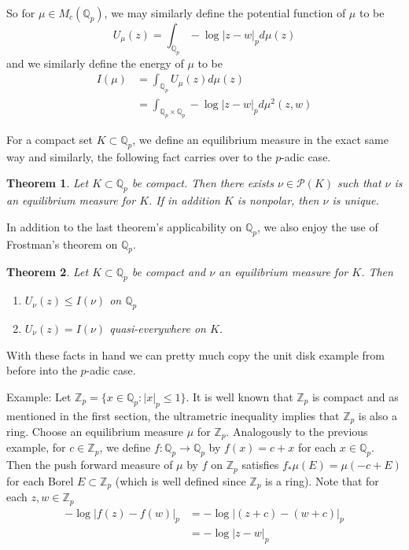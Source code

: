 \documentclass[12pt]{amsart}
\newtheorem{thm}{Theorem}[subsection]
\theoremstyle{definition}
\theoremstyle{remark}
\theoremstyle{definition}
\newcommand{\Z}{\mathbb{Z}}
\newcommand{\Q}{\mathbb{Q}}
\newcommand{\MCP}{\mathcal{P}}
\begin{document}
So for $\mu \in M_c(\Q_p)$, we may similarly define the potential function of $\mu$ to be $$U_{\mu}(z) = \int_{\Q_p}-\log|z-w|_pd\mu (z)$$ and we similarly define the energy of $\mu$ to be 
\begin{align*}
I(\mu) 
&= \int_{\Q_p}U_{\mu}(z)d \mu (z)\\
&= \int_{\Q_p \times \Q_p}-\log|z-w|_p d\mu^2(z,w)
\end{align*}

For a compact set $K \subset \Q_p$, we define an equilibrium measure in the exact same way and similarly, the following fact carries over to the $p$-adic case.

\begin{thm}
Let $K \subset \Q_p$ be compact. Then there exists $\nu \in \MCP(K)$ such that $\nu$ is an equilibrium measure for $K$. If in addition $K$ is nonpolar, then $\nu$ is unique.
\end{thm}

In addition to the last theorem's applicability on $\Q_p$, we also enjoy the use of Frostman's theorem on $\Q_p$.

\begin{thm}
Let $K \subset \Q_p$ be compact and $\nu$ an equilibrium measure for $K$. Then 
\begin{enumerate}
\item $U_\nu(z) \leq I(\nu)$ on $\Q_p$
\item $U_\nu(z) = I(\nu)$ quasi-everywhere on $K$. 
\end{enumerate}
\end{thm}

With these facts in hand we can pretty much copy the unit disk example from before into the $p$-adic case.

Example: Let $\Z_p = \{x \in \Q_p: |x|_p \leq 1\}$. It is well known that $\Z_p$ is compact and as mentioned in the first section, the ultrametric inequality implies that $\Z_p$ is also a ring. Choose an equilibrium measure $\mu$ for $\Z_p$. Analogously to the previous example, for $c \in \Z_p$, we define $f:\Q_p \rightarrow \Q_p$ by $f(x) = c + x$ for each $x \in \Q_p$. Then the push forward measure of $\mu$ by $f$ on $\Z_p$ satisfies $f_*\mu(E) = \mu(-c + E)$ for each Borel $E \subset \Z_p$ (which is well defined since $\Z_p$ is a ring). Note that for each $z,w \in \Z_p$  
\begin{align*}
-\log|f(z)-f(w)|_p 
&= -\log|(z+c) - (w+c)|_p\\
&= -\log|z-w|_p 
\end{align*} 
\end{document}
